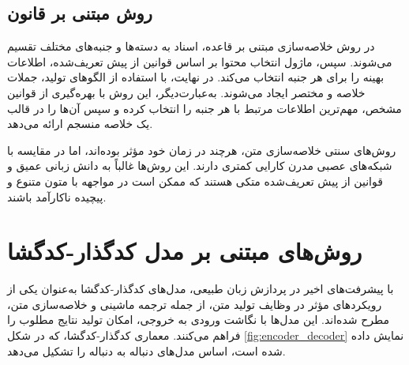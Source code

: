 \subsection{روش مبتنی بر قانون }


در روش خلاصه‌سازی مبتنی بر قاعده، اسناد به دسته‌ها و جنبه‌های مختلف تقسیم می‌شوند. سپس، ماژول انتخاب محتوا بر اساس قوانین از پیش تعریف‌شده، اطلاعات بهینه را برای هر جنبه انتخاب می‌کند. در نهایت، با استفاده از الگوهای تولید، جملات خلاصه و مختصر ایجاد می‌شوند. به‌عبارت‌دیگر، این روش با بهره‌گیری از قوانین مشخص، مهم‌ترین اطلاعات مرتبط با هر جنبه را انتخاب کرده و سپس آن‌ها را در قالب یک خلاصه منسجم ارائه می‌دهد\cite{Moratanchsurvey}.




% 
روش‌های سنتی خلاصه‌سازی متن، هرچند در زمان خود مؤثر بوده‌اند، اما در مقایسه با شبکه‌های عصبی مدرن کارایی کمتری دارند. این روش‌ها غالباً به دانش زبانی عمیق و قوانین از پیش تعریف‌شده متکی هستند که ممکن است در مواجهه با متون متنوع و پیچیده ناکارآمد باشند.

\section{روش‌های مبتنی بر مدل کدگذار-کدگشا}
با پیشرفت‌های اخیر در پردازش زبان طبیعی، مدل‌های کدگذار-کدگشا به‌عنوان یکی از رویکردهای مؤثر در وظایف تولید متن، از جمله ترجمه ماشینی و خلاصه‌سازی متن، مطرح شده‌اند. این مدل‌ها با نگاشت ورودی به خروجی، امکان تولید نتایج مطلوب را فراهم می‌کنند. معماری کدگذار-کدگشا، که در شکل \ref{fig:encoder_decoder} نمایش داده شده است، اساس مدل‌های دنباله به دنباله را تشکیل می‌دهد.


